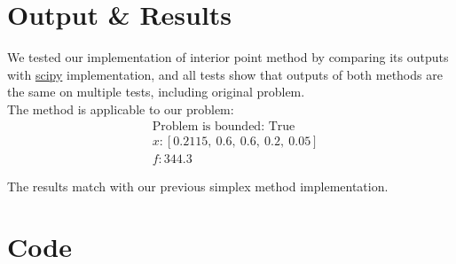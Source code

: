 \documentclass{article}
\begin{document}
\section{Output \& Results}
We tested our implementation of interior point method by comparing its outputs
with \href{https://scipy.org}{scipy} implementation, and all tests show that
outputs of both methods are the same on multiple tests, including original
problem. \\ The method is applicable to our problem:
\begin{align*}
     & \text{Problem is bounded: True}          \\
     & x: [0.2115, \ 0.6, \ 0.6, \ 0.2, \ 0.05] \\
     & f: 344.3
\end{align*}

The results match with our previous simplex method implementation.

\section{Code}
\end{document}
